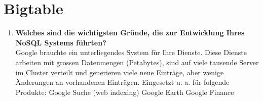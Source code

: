 \documentclass[a4paper,10pt,titlepage=false]{scrreprt}
\begin{document}
\section{Bigtable} %
\label{sec:bigtable}
\begin{enumerate}
  \item \textbf{Welches sind die wichtigsten Gründe, die zur Entwicklung Ihres NoSQL Systems führten?}\\
  Google brauchte ein unterliegendes System für Ihre Dienste. Diese Dienste arbeiten mit grossen Datenmengen (Petabytes), sind auf viele tausende Server im Cluster verteilt und generieren viele neue Einträge, aber wenige Änderungen an vorhandenen Einträgen. 
Eingesetzt u. a. für folgende Produkte: Google Suche (web indexing)
Google Earth
Google Finance\\


\end{enumerate}
\end{document}
